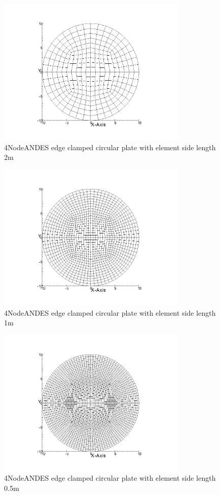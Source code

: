 \documentclass[fleqn,11pt,letter]{article}
\begin{document}
\begin{figure}[H]
  \centering
  \includegraphics[width=9cm]{../Figure_files/4NodeANDES/circular_plate3.png}
  \caption{4NodeANDES edge clamped circular plate with element side length 2m }
  \label{fig 4NodeANDES edges clamped circular plate with element side length 2m }
\end{figure}

\newpage

\begin{figure}[H]
  \centering
  \includegraphics[width=9cm]{../Figure_files/4NodeANDES/circular_plate4.png}
  \caption{4NodeANDES edge clamped circular plate with element side length 1m }
  \label{fig 4NodeANDES edges clamped circular plate with element side length 1m }
\end{figure}


\begin{figure}[H]
  \centering
  \includegraphics[width=9cm]{../Figure_files/4NodeANDES/circular_plate5.png}
  \caption{4NodeANDES edge clamped circular plate with element side length 0.5m }
  \label{fig 4NodeANDES edges clamped circular plate with element side length 0.5m }
\end{figure}
\end{document}
